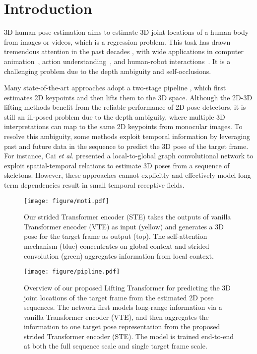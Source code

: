 \documentclass[10pt,twocolumn,letterpaper]{article}
\begin{document}
\section{Introduction}
3D human pose estimation aims to estimate 3D joint locations of a human body from images or videos, which is a regression problem. 
This task has drawn tremendous attention in the past decades \cite{radwan2013monocular,li20143d,zhou2017towards,dabral2018learning}, with wide applications in computer animation~\cite{pullen2002motion}, action understanding~\cite{wang2018rgb,liu2017enhanced,liu2018recognizing}, and human-robot interactions~\cite{garcia2019human,gui2018teaching}. 
It is a challenging problem due to the depth ambiguity and self-occlusions. 

Many state-of-the-art approaches adopt a two-stage pipeline \cite{martinez2017simple,pavllo20193d,wang2020motion}, which first estimates 2D keypoints and then lifts them to the 3D space. 
Although the 2D-3D lifting methods benefit from the reliable performance of 2D pose detectors, it is still an ill-posed problem due to the depth ambiguity, where multiple 3D interpretations can map to the same 2D keypoints from monocular images.
To resolve this ambiguity, some methods \cite{lee2018propagating,rayat2018exploiting,cai2019exploiting} exploit temporal information by leveraging past and future data in the sequence to predict the 3D pose of the target frame. 
For instance, Cai \emph{et al.} \cite{cai2019exploiting} presented a local-to-global graph convolutional network to exploit spatial-temporal relations to estimate 3D poses from a sequence of skeletons. 
However, these approaches cannot explicitly and effectively model long-term dependencies result in small temporal receptive fields. 

\begin{figure}[t]
	\centering
	\texttt{[image: figure/moti.pdf]}
	\caption
	{
      Our strided Transformer encoder (STE) takes the outputs of vanilla Transformer encoder (VTE) as input (yellow) and generates a 3D pose for the target frame as output (top). 
      The self-attention mechanism (blue) concentrates on global context and strided convolution (green) aggregates information from local context. 
	}
	\label{fig:moti}
\end{figure}

\begin{figure*}[t]
	\centering
	\texttt{[image: figure/pipline.pdf]}
	\caption
	{
      Overview of our proposed Lifting Transformer for predicting the 3D joint locations of the target frame from the estimated 2D pose sequences. 
      The network first models long-range information via a vanilla Transformer encoder (VTE), 
      and then aggregates the information to one target pose representation from the proposed strided Transformer encoder (STE). 
      The model is trained end-to-end at both the full sequence scale and single target frame scale. 
	}
	\label{fig:pipline}
\end{figure*}
\end{document}
